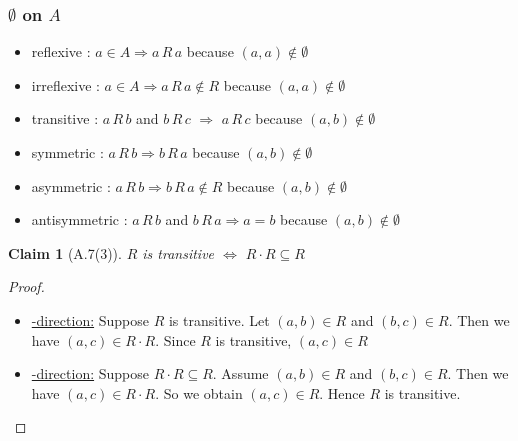 \documentclass[12pt,aspectratio=169]{beamer}
\theoremstyle{claim}
\newtheorem{claim}[theorem]{Claim}%
\begin{document}
\newcommand{\RL}[2]{#1\, R\, #2}
\begin{frame}
    \frametitle{$\emptyset$ on $A$}
    \begin{itemize}
    \pause
    \item reflexive     : $a\in A \Rightarrow \RL{a}{a}$ \pause \quad \no \; \pause because $(a,a) \notin \emptyset$
    \pause
    \item irreflexive   : $a \in A \Rightarrow \RL{a}{a} \notin R$ \pause \quad \yes \; \pause because $(a,a)\notin \emptyset$
    \pause
    \item transitive    : $\RL{a}{b}$ and $\RL{b}{c}$ $\Rightarrow$ $\RL{a}{c}$ \pause \yes\; \pause because $(a,b) \notin \emptyset$
    \pause
    \item symmetric     : $\RL{a}{b} \Rightarrow \RL{b}{a}$ \quad \pause \yes\; \pause because $(a,b) \notin \emptyset$
    \pause
    \item asymmetric    : $\RL{a}{b} \Rightarrow \RL{b}{a} \notin R$ \pause \quad \yes\; \pause because $(a,b) \notin \emptyset$
    \pause
    \item antisymmetric : $\RL{a}{b}$ and $\RL{b}{a} \Rightarrow a=b$ \pause \quad \yes\; \pause because $(a,b) \notin \emptyset$
    \end{itemize}
\end{frame}

\begin{frame}
    \begin{claim}[A.7(3)]
        $R$ is transitive $\Leftrightarrow$ $R \cdot R \subseteq R$
    \end{claim}

    \begin{proof}
        \begin{itemize}
            \pause
            \item \underline{\Rightarrow-direction:} \pause
            Suppose $R$ is transitive. \pause
            Let $(a,b) \in R$ and $(b,c) \in R$. \pause
            Then we have $(a,c) \in R \cdot R$. \pause
            Since $R$ is transitive, $(a,c) \in R$ \pause
            \item \underline{\Leftarrow-direction:} \pause
            Suppose $R \cdot R \subseteq R$. \pause
            Assume $(a,b) \in R$ and $(b,c) \in R$. \pause
            Then we have $(a,c) \in R \cdot R$. \pause
            So we obtain $(a,c) \in R$. \pause
            Hence $R$ is transitive.
      \end{itemize}
    \end{proof}
\end{frame}
\end{document}
